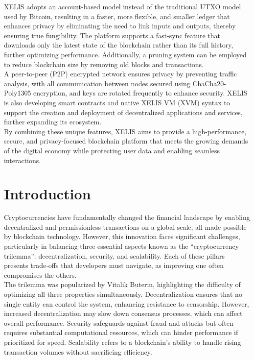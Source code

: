 \documentclass[10pt,a4paper,twocolumn]{article}
\begin{document}
XELIS adopts an account-based model instead of the traditional UTXO model used by Bitcoin, resulting in a faster, more flexible, and smaller ledger that enhances privacy by eliminating the need to link inputs and outputs, thereby ensuring true fungibility. The platform supports a fast-sync feature that downloads only the latest state of the blockchain rather than its full history, further optimizing performance. Additionally, a pruning system can be employed to reduce blockchain size by removing old blocks and transactions.\\

A peer-to-peer (P2P) encrypted network ensures privacy by preventing traffic analysis, with all communication between nodes secured using ChaCha20-Poly1305 encryption, and keys are rotated frequently to enhance security. XELIS is also developing smart contracts and native XELIS VM (XVM) syntax to support the creation and deployment of decentralized applications and services, further expanding its ecosystem.\\

By combining these unique features, XELIS aims to provide a high-performance, secure, and privacy-focused blockchain platform that meets the growing demands of the digital economy while protecting user data and enabling seamless interactions.\\

\section{Introduction}

Cryptocurrencies have fundamentally changed the financial landscape by enabling decentralized and permissionless transactions on a global scale, all made possible by blockchain technology. However, this innovation faces significant challenges, particularly in balancing three essential aspects known as the “cryptocurrency trilemma”: decentralization, security, and scalability. Each of these pillars presents trade-offs that developers must navigate, as improving one often compromises the others.\\

The trilemma was popularized by Vitalik Buterin, highlighting the difficulty of optimizing all three properties simultaneously. Decentralization ensures that no single entity can control the system, enhancing resistance to censorship. However, increased decentralization may slow down consensus processes, which can affect overall performance. Security safeguards against fraud and attacks but often requires substantial computational resources, which can hinder performance if prioritized for speed. Scalability refers to a blockchain's ability to handle rising transaction volumes without sacrificing efficiency.\\
\end{document}

